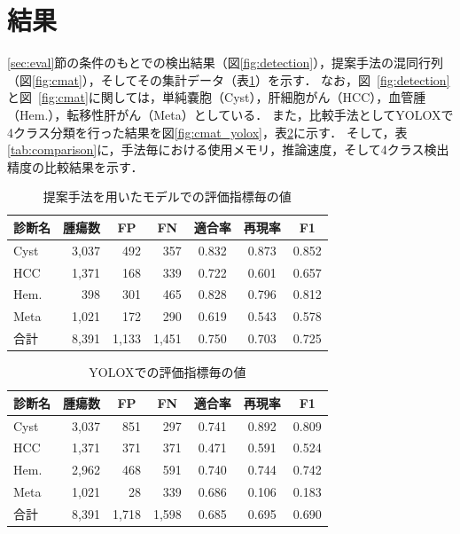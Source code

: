 \documentclass[a4j,8pt,twocolumn]{extarticle}
\begin{document}
    \section{結果}
        \label{sec:result}
        \ref{sec:eval}節の条件のもとでの検出結果（図\ref{fig:detection}），提案手法の混同行列（図\ref{fig:cmat}），そしてその集計データ（表\ref{tab:metric}）を示す．
        なお，図~\ref{fig:detection}と図~\ref{fig:cmat}に関しては，単純嚢胞（Cyst），肝細胞がん（HCC），血管腫（Hem.），転移性肝がん（Meta）としている．
        また，比較手法としてYOLOX\cite{ge2021yolox}で4クラス分類を行った結果を図\ref{fig:cmat_yolox}，表\ref{tab:metric_yolox}に示す．
        そして，表\ref{tab:comparison}に，手法毎における使用メモリ，推論速度，そして4クラス検出精度の比較結果を示す．

        \begin{table}[t]
            \centering
            \caption{提案手法を用いたモデルでの評価指標毎の値}
            \label{tab:metric}
                \begin{tabular}{l|rrr|ccc} \hline
                    診断名 & \multicolumn{1}{c}{腫瘍数} & \multicolumn{1}{c}{FP} & \multicolumn{1}{c|}{FN} & 適合率 & 再現率 & F1 \\ \hline
                    Cyst & 3,037 & 492 & 357 & 0.832 & 0.873 & 0.852 \\
                    HCC & 1,371 & 168 & 339 & 0.722 & 0.601 & 0.657 \\
                    Hem. & 398 & 301 & 465 & 0.828 & 0.796 & 0.812 \\
                    Meta & 1,021 & 172 & 290 & 0.619 & 0.543 & 0.578 \\ \hline
                    合計 & 8,391 & 1,133 & 1,451 & 0.750 & 0.703 & 0.725 \\ \hline
                \end{tabular}
        \end{table}

        \begin{table}[t]
            \centering
            \caption{YOLOXでの評価指標毎の値}
            \label{tab:metric_yolox}
            \begin{tabular}{l|rrr|ccc} \hline
                診断名 & \multicolumn{1}{c}{腫瘍数} & \multicolumn{1}{c}{FP} & \multicolumn{1}{c|}{FN} & 適合率 & 再現率 & F1 \\ \hline
                Cyst & 3,037 & 851 & 297 & 0.741 & 0.892 & 0.809 \\
                HCC & 1,371 & 371 & 371 & 0.471 & 0.591 & 0.524 \\
                Hem. & 2,962 & 468 & 591 & 0.740 & 0.744 & 0.742 \\
                Meta & 1,021 & 28 & 339 & 0.686 & 0.106 & 0.183 \\ \hline
                合計 & 8,391 & 1,718 & 1,598 & 0.685 & 0.695 & 0.690 \\ \hline
            \end{tabular}
        \end{table}
\end{document}
